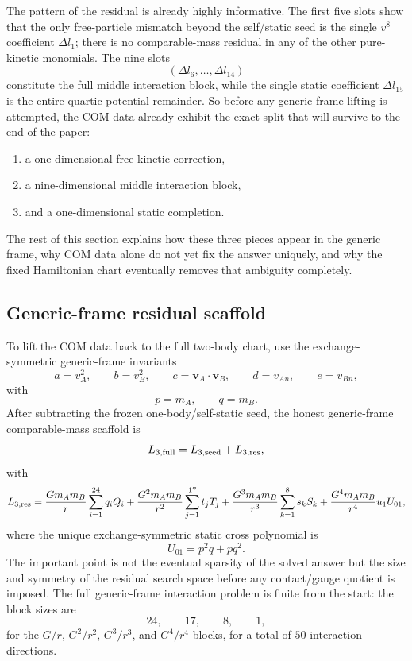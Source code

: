 \documentclass[11pt]{article}
\begin{document}
The pattern of the residual is already highly informative.  The first five slots
show that the only free-particle mismatch beyond the self/static seed is the
single $v^8$ coefficient $\Delta l_1$; there is no comparable-mass residual in
any of the other pure-kinetic monomials.  The nine slots
\[
(\Delta l_6,\dots,\Delta l_{14})
\]
constitute the full middle interaction block, while the single static coefficient
$\Delta l_{15}$ is the entire quartic potential remainder.  So before any
generic-frame lifting is attempted, the COM data already exhibit the exact split
that will survive to the end of the paper:
\begin{enumerate}
  \item a one-dimensional free-kinetic correction,
  \item a nine-dimensional middle interaction block,
  \item and a one-dimensional static completion.
\end{enumerate}
The rest of this section explains how these three pieces appear in the generic
frame, why COM data alone do not yet fix the answer uniquely, and why the fixed
Hamiltonian chart eventually removes that ambiguity completely.

\subsection{Generic-frame residual scaffold}
\label{sec:compmass-generic-scaffold}

To lift the COM data back to the full two-body chart, use the exchange-symmetric
generic-frame invariants
\[
 a=v_A^2,
 \qquad
 b=v_B^2,
 \qquad
 c=\mathbf v_A\!\cdot\!\mathbf v_B,
 \qquad
 d=v_{An},
 \qquad
 e=v_{Bn},
\]
with
\[
 p=m_A,
 \qquad
 q=m_B.
\]
After subtracting the frozen one-body/self-static seed, the honest generic-frame
comparable-mass scaffold is
\[
L_{3,\rm full}=L_{3,\rm seed}+L_{3,\rm res},
\]
with
\[
L_{3,\rm res}=
\frac{Gm_A m_B}{r}\sum_{i=1}^{24}q_iQ_i
+\frac{G^2m_A m_B}{r^2}\sum_{j=1}^{17}t_jT_j
+\frac{G^3m_A m_B}{r^3}\sum_{k=1}^{8}s_kS_k
+\frac{G^4m_A m_B}{r^4}u_1U_{01},
\]
where the unique exchange-symmetric static cross polynomial is
\[
U_{01}=p^2q+pq^2.
\]
The important point is not the eventual sparsity of the solved answer but the
size and symmetry of the residual search space before any contact/gauge quotient
is imposed.  The full generic-frame interaction problem is finite from the
start: the block sizes are
\[
24,\qquad 17,\qquad 8,\qquad 1,
\]
for the $G/r$, $G^2/r^2$, $G^3/r^3$, and $G^4/r^4$ blocks, for a total of $50$
interaction directions.
\end{document}
